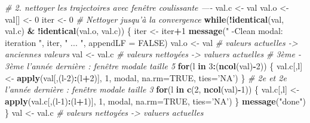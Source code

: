 \documentclass[a4paper, notitlepage, 12pt, krantz2]{krantz}
\newenvironment{Shaded}{\begin{snugshade}}{\end{snugshade}}
\newcommand{\CommentTok}[1]{\textcolor[rgb]{0.56,0.35,0.01}{\textit{#1}}}
\newcommand{\ControlFlowTok}[1]{\textcolor[rgb]{0.13,0.29,0.53}{\textbf{#1}}}
\newcommand{\DataTypeTok}[1]{\textcolor[rgb]{0.13,0.29,0.53}{#1}}
\newcommand{\DecValTok}[1]{\textcolor[rgb]{0.00,0.00,0.81}{#1}}
\newcommand{\KeywordTok}[1]{\textcolor[rgb]{0.13,0.29,0.53}{\textbf{#1}}}
\newcommand{\NormalTok}[1]{#1}
\newcommand{\OperatorTok}[1]{\textcolor[rgb]{0.81,0.36,0.00}{\textbf{#1}}}
\newcommand{\OtherTok}[1]{\textcolor[rgb]{0.56,0.35,0.01}{#1}}
\newcommand{\StringTok}[1]{\textcolor[rgb]{0.31,0.60,0.02}{#1}}
\begin{document}
\begin{Shaded}
\begin{Highlighting}[]
{{{    \CommentTok{# 2. nettoyer les trajectoires avec fenêtre coulissante ----}
\NormalTok{    val.c   <-}\StringTok{ }\NormalTok{val}
\NormalTok{    val.o <-}\StringTok{ }\NormalTok{val[] <-}\StringTok{ }\DecValTok{0}
\NormalTok{    iter    <-}\StringTok{ }\DecValTok{0}   
    \CommentTok{# Nettoyer jusqu'à la convergence}
    \ControlFlowTok{while}\NormalTok{(}\OperatorTok{!}\KeywordTok{identical}\NormalTok{(val, val.c) }\OperatorTok{&}\StringTok{ }\OperatorTok{!}\KeywordTok{identical}\NormalTok{(val.o, val.c)) \{   }
\NormalTok{      iter <-}\StringTok{ }\NormalTok{iter}\OperatorTok{+}\DecValTok{1}
      \KeywordTok{message}\NormalTok{(}\StringTok{"    -Clean modal: iteration "}\NormalTok{, iter, }\StringTok{" ... "}\NormalTok{, }\DataTypeTok{appendLF =} \OtherTok{FALSE}\NormalTok{)}
\NormalTok{      val.o <-}\StringTok{ }\NormalTok{val  }\CommentTok{# valeurs actuelles -> anciennes valeurs}
\NormalTok{      val <-}\StringTok{ }\NormalTok{val.c  }\CommentTok{# valeurs nettoyées -> valuers actuelles}
      \CommentTok{# 3ème - 3ème l'année dernière : fenêtre modale taille 5 }
      \ControlFlowTok{for}\NormalTok{(l }\ControlFlowTok{in} \DecValTok{3}\OperatorTok{:}\NormalTok{(}\KeywordTok{ncol}\NormalTok{(val)}\OperatorTok{-}\DecValTok{2}\NormalTok{)) \{                             }
\NormalTok{        val.c[,l] <-}\StringTok{ }\KeywordTok{apply}\NormalTok{(val[,(l}\DecValTok{-2}\NormalTok{)}\OperatorTok{:}\NormalTok{(l}\OperatorTok{+}\DecValTok{2}\NormalTok{)], }\DecValTok{1}\NormalTok{, modal, }\DataTypeTok{na.rm=}\OtherTok{TRUE}\NormalTok{, }\DataTypeTok{ties=}\StringTok{'NA'}\NormalTok{)}
\NormalTok{      \}}
      \CommentTok{# 2e et 2e l'année dernière : fenêtre modale taille 3 }
      \ControlFlowTok{for}\NormalTok{(l }\ControlFlowTok{in} \KeywordTok{c}\NormalTok{(}\DecValTok{2}\NormalTok{, }\KeywordTok{ncol}\NormalTok{(val)}\OperatorTok{-}\DecValTok{1}\NormalTok{)) \{                           }
\NormalTok{        val.c[,l] <-}\StringTok{ }\KeywordTok{apply}\NormalTok{(val.c[,(l}\DecValTok{-1}\NormalTok{)}\OperatorTok{:}\NormalTok{(l}\OperatorTok{+}\DecValTok{1}\NormalTok{)], }\DecValTok{1}\NormalTok{, modal, }\DataTypeTok{na.rm=}\OtherTok{TRUE}\NormalTok{, }\DataTypeTok{ties=}\StringTok{'NA'}\NormalTok{)}
\NormalTok{      \}}
      \KeywordTok{message}\NormalTok{(}\StringTok{"done"}\NormalTok{)}
\NormalTok{    \}}
\NormalTok{    val <-}\StringTok{ }\NormalTok{val.c    }\CommentTok{# valeurs nettoyées -> valuers actuelles}
    
}}}
\end{Highlighting}
\end{Shaded}
\end{document}
